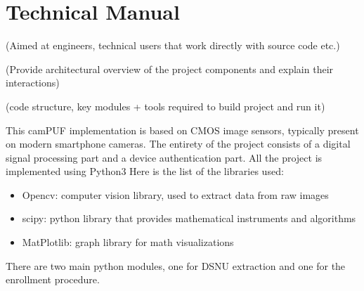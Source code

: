 \documentclass{article}
\begin{document}
\section{\textbf{Technical Manual}}
(Aimed at engineers, technical users that work directly with source code etc.)

(Provide architectural overview of the project components and explain their interactions)

(code structure, key modules + tools required to build project and run it)

This camPUF implementation is based on CMOS image sensors, typically present on modern smartphone cameras.
The entirety of the project consists of a digital signal processing part and a device authentication part.
All the project is implemented using Python3
Here is the list of the libraries used:

\begin{itemize}
\item Opencv: computer vision library, used to extract data from raw images 
\item scipy: python library that provides mathematical instruments and algorithms
\item MatPlotlib: graph library for math visualizations
\end{itemize}

There are two main python modules, one for DSNU extraction and one for the enrollment procedure.
\end{document}
